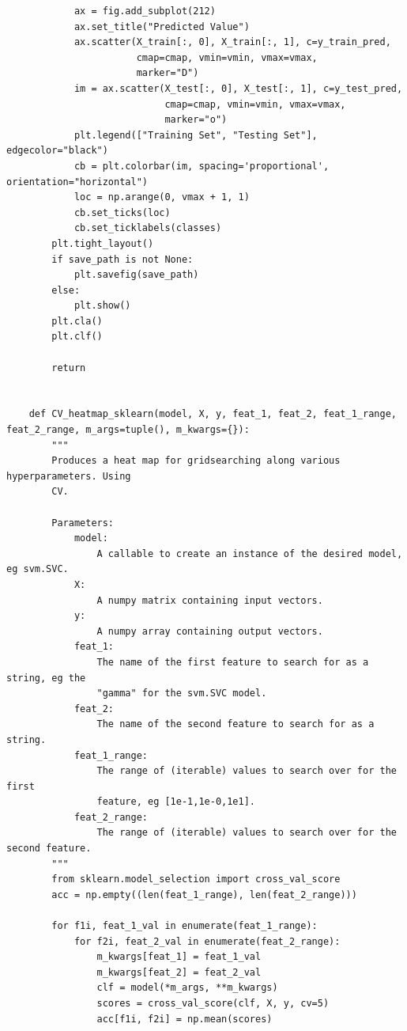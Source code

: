 \documentclass{article}
\begin{document}
\begin{verbatim}
            ax = fig.add_subplot(212)
            ax.set_title("Predicted Value")
            ax.scatter(X_train[:, 0], X_train[:, 1], c=y_train_pred,
                       cmap=cmap, vmin=vmin, vmax=vmax,
                       marker="D")
            im = ax.scatter(X_test[:, 0], X_test[:, 1], c=y_test_pred,
                            cmap=cmap, vmin=vmin, vmax=vmax,
                            marker="o")
            plt.legend(["Training Set", "Testing Set"], edgecolor="black")
            cb = plt.colorbar(im, spacing='proportional', orientation="horizontal")
            loc = np.arange(0, vmax + 1, 1)
            cb.set_ticks(loc)
            cb.set_ticklabels(classes)
        plt.tight_layout()
        if save_path is not None:
            plt.savefig(save_path)
        else:
            plt.show()
        plt.cla()
        plt.clf()
    
        return
    
    
    def CV_heatmap_sklearn(model, X, y, feat_1, feat_2, feat_1_range, feat_2_range, m_args=tuple(), m_kwargs={}):
        """
        Produces a heat map for gridsearching along various hyperparameters. Using
        CV.
    
        Parameters:
            model:
                A callable to create an instance of the desired model, eg svm.SVC.
            X:
                A numpy matrix containing input vectors.
            y:
                A numpy array containing output vectors.
            feat_1:
                The name of the first feature to search for as a string, eg the 
                "gamma" for the svm.SVC model.
            feat_2:
                The name of the second feature to search for as a string.
            feat_1_range:
                The range of (iterable) values to search over for the first 
                feature, eg [1e-1,1e-0,1e1].
            feat_2_range:
                The range of (iterable) values to search over for the second feature.
        """
        from sklearn.model_selection import cross_val_score
        acc = np.empty((len(feat_1_range), len(feat_2_range)))
    
        for f1i, feat_1_val in enumerate(feat_1_range):
            for f2i, feat_2_val in enumerate(feat_2_range):
                m_kwargs[feat_1] = feat_1_val
                m_kwargs[feat_2] = feat_2_val
                clf = model(*m_args, **m_kwargs)
                scores = cross_val_score(clf, X, y, cv=5)
                acc[f1i, f2i] = np.mean(scores)
    

\end{verbatim}
\end{document}
